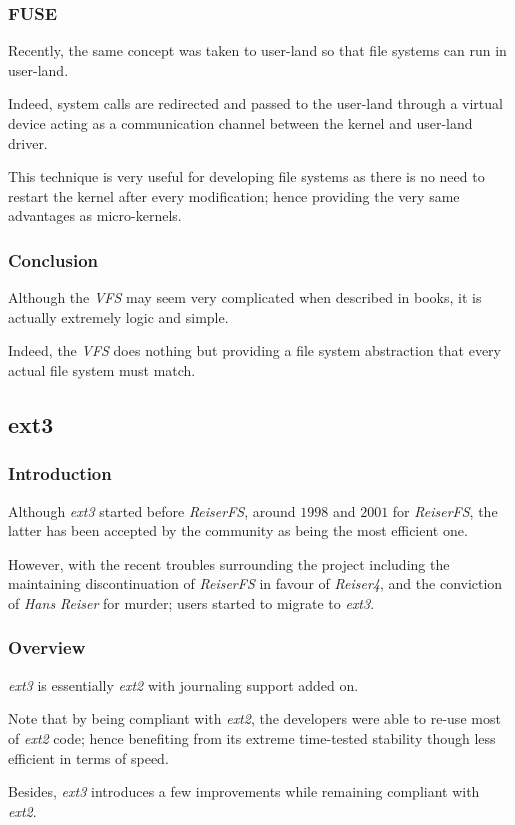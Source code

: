 
\begin{frame}
  \frametitle{FUSE}

  Recently, the same concept was taken to user-land so that file systems
  can run in user-land.

  \-

  Indeed, system calls are redirected and passed to the user-land through
  a virtual device acting as a communication channel between the kernel
  and user-land driver.

  \-

  This technique is very useful for developing file systems as there is
  no need to restart the kernel after every modification; hence providing the
  very same advantages as micro-kernels.
\end{frame}


\begin{frame}
  \frametitle{Conclusion}

  Although the \textit{VFS} may seem very complicated when described in
  books, it is actually extremely logic and simple.

  \-

  Indeed, the \textit{VFS} does nothing but providing a file system abstraction
  that every actual file system must match.
\end{frame}


\subsection{ext3}


\begin{frame}
  \frametitle{Introduction}

  Although \textit{ext3} started before \textit{ReiserFS}, around $1998$ and
  $2001$ for \textit{ReiserFS}, the latter has been accepted by the community
  as being the most efficient one.

  \-

  However, with the recent troubles surrounding the project including the
  maintaining discontinuation of \textit{ReiserFS} in favour of
  \textit{Reiser4}, and the conviction of \textit{Hans Reiser} for murder;
  users started to migrate to \textit{ext3}.
\end{frame}


\begin{frame}
  \frametitle{Overview}

  \textit{ext3} is essentially \textit{ext2} with journaling support added on.

  \-

  Note that by being compliant with \textit{ext2}, the developers were able
  to re-use most of \textit{ext2} code; hence benefiting from its extreme
  time-tested stability though less efficient in terms of speed.

  \-

  Besides, \textit{ext3} introduces a few improvements while remaining
  compliant with \textit{ext2}.
\end{frame}

